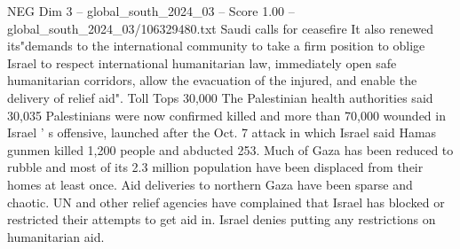 \begin{textsample}{NEG Dim 3 – global\_south\_2024\_03 – Score 1.00 – global\_south\_2024\_03/106329480.txt}
Saudi calls for ceasefire It also renewed its"demands to the international community to take a firm position to oblige Israel to respect international humanitarian law, immediately open safe humanitarian corridors, allow the evacuation of the injured, and enable the delivery of relief aid".
Toll Tops 30,000 The Palestinian health authorities said 30,035 Palestinians were now confirmed killed and more than 70,000 wounded in Israel ' s offensive, launched after the Oct. 7 attack in which Israel said Hamas gunmen killed 1,200 people and abducted 253.
Much of Gaza has been reduced to rubble and most of its 2.3 million population have been displaced from their homes at least once.
Aid deliveries to northern Gaza have been sparse and chaotic.
UN and other relief agencies have complained that Israel has blocked or restricted their attempts to get aid in.
Israel denies putting any restrictions on humanitarian aid.

\end{textsample}
